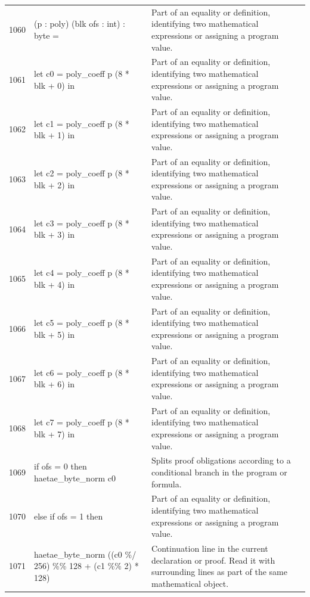 \documentclass[10pt]{article}
\begin{document}
\begin{longtable}{r L{0.53\textwidth} L{0.37\textwidth}}
1060 & {\ttfamily\scriptsize    (p : poly) (blk ofs : int) : byte =} & Part of an equality or definition, identifying two mathematical expressions or assigning a program value. \\
1061 & {\ttfamily\scriptsize   let c0 = poly\_coeff p (8 * blk + 0) in} & Part of an equality or definition, identifying two mathematical expressions or assigning a program value. \\
1062 & {\ttfamily\scriptsize   let c1 = poly\_coeff p (8 * blk + 1) in} & Part of an equality or definition, identifying two mathematical expressions or assigning a program value. \\
1063 & {\ttfamily\scriptsize   let c2 = poly\_coeff p (8 * blk + 2) in} & Part of an equality or definition, identifying two mathematical expressions or assigning a program value. \\
1064 & {\ttfamily\scriptsize   let c3 = poly\_coeff p (8 * blk + 3) in} & Part of an equality or definition, identifying two mathematical expressions or assigning a program value. \\
1065 & {\ttfamily\scriptsize   let c4 = poly\_coeff p (8 * blk + 4) in} & Part of an equality or definition, identifying two mathematical expressions or assigning a program value. \\
1066 & {\ttfamily\scriptsize   let c5 = poly\_coeff p (8 * blk + 5) in} & Part of an equality or definition, identifying two mathematical expressions or assigning a program value. \\
1067 & {\ttfamily\scriptsize   let c6 = poly\_coeff p (8 * blk + 6) in} & Part of an equality or definition, identifying two mathematical expressions or assigning a program value. \\
1068 & {\ttfamily\scriptsize   let c7 = poly\_coeff p (8 * blk + 7) in} & Part of an equality or definition, identifying two mathematical expressions or assigning a program value. \\
1069 & {\ttfamily\scriptsize   if ofs = 0 then haetae\_byte\_norm c0} & Splits proof obligations according to a conditional branch in the program or formula. \\
1070 & {\ttfamily\scriptsize   else if ofs = 1 then} & Part of an equality or definition, identifying two mathematical expressions or assigning a program value. \\
1071 & {\ttfamily\scriptsize     haetae\_byte\_norm ((c0 \%/ 256) \%\% 128 + (c1 \%\% 2) * 128)} & Continuation line in the current declaration or proof.  Read it with surrounding lines as part of the same mathematical object. \\

\end{longtable}
\end{document}
